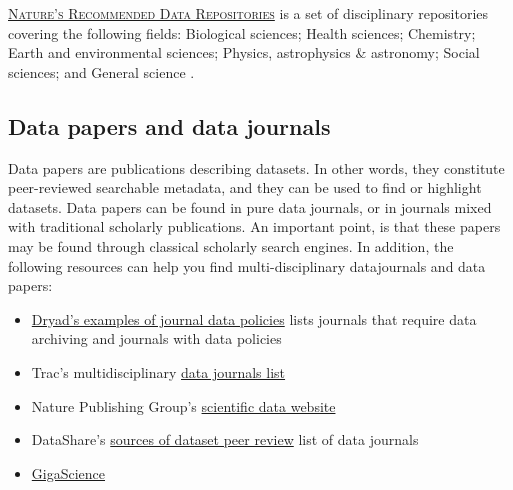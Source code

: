 \vspace{0.4cm}

\noindent {}  \textsc{\href{http://www.nature.com/sdata/data-policies/repositories}{Nature's Recommended Data Repositories}} is a set of disciplinary repositories covering the following fields: Biological sciences; Health sciences; Chemistry; Earth and environmental sciences; Physics, astrophysics \& astronomy; Social sciences; and General science \cite{nature_publishing_group_recommended_2014}.

\subsection{Data papers and data journals}
\label{data_papers}

 Data papers are publications describing datasets. In other words, they constitute peer-reviewed searchable metadata, and they can be used to find or highlight datasets. Data papers can be found in pure data journals, or in journals mixed with traditional scholarly publications. An important point, is that these papers may be found through classical scholarly search engines. In addition, the following resources can help you find multi-disciplinary datajournals and data papers:
\begin{itemize}
\item {} \href{http://wiki.datadryad.org/Journal_instructions#Examples_of_journal_data_policies}{Dryad's examples of journal data policies} lists journals that require data archiving and journals with data policies \cite{dryad_journal_2015}
\item {} Trac's multidisciplinary \href{http://proj.badc.rl.ac.uk/preparde/blog/DataJournalsList}{data journals list}\cite{trac_blog:_2013}
\item {} Nature Publishing Group's \href{http://www.nature.com/sdata/}{scientific data website} \cite{nature_publishing_group_scientific_2015}
\item DataShare's \href{https://www.wiki.ed.ac.uk/display/datashare/Sources+of+dataset+peer+review}{sources of dataset peer review} list of data journals \cite{datashare_sources_2015}
\item {} \href{http://www.gigasciencejournal.com/}{GigaScience} \cite{gigascience_gigascience_2015}
\end{itemize}

